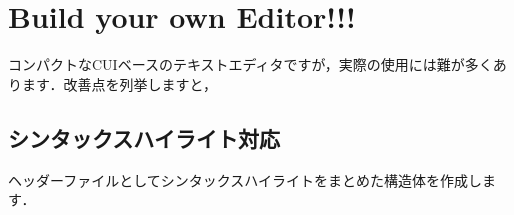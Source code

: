  \inputminted[frame=lines,framesep=2mm,baselinestretch=1.2,fontsize=\footnotesize,linenos,breaklines]{c}{\takuzooasset/struct.c}

 \inputminted[frame=lines,framesep=2mm,baselinestretch=1.2,fontsize=\footnotesize,linenos,breaklines]{c}{\takuzooasset/initEditor.c}

 \inputminted[frame=lines,framesep=2mm,baselinestretch=1.2,fontsize=\footnotesize,linenos,breaklines]{c}{\takuzooasset/editorSelectSyntaxHighlight.c}

 \inputminted[frame=lines,framesep=2mm,baselinestretch=1.2,fontsize=\footnotesize,linenos,breaklines]{c}{\takuzooasset/editorOpen.c}

 \inputminted[frame=lines,framesep=2mm,baselinestretch=1.2,fontsize=\footnotesize,linenos,breaklines]{c}{\takuzooasset/enableRawMode.c}

 \inputminted[frame=lines,framesep=2mm,baselinestretch=1.2,fontsize=\footnotesize,linenos,breaklines]{c}{\takuzooasset/enableRawMode.c}

\section{Build your own Editor!!!}
コンパクトなCUIベースのテキストエディタですが，実際の使用には難が多くあります．改善点を列挙しますと，

\subsection{シンタックスハイライト対応}
ヘッダーファイルとしてシンタックスハイライトをまとめた構造体を作成します．
